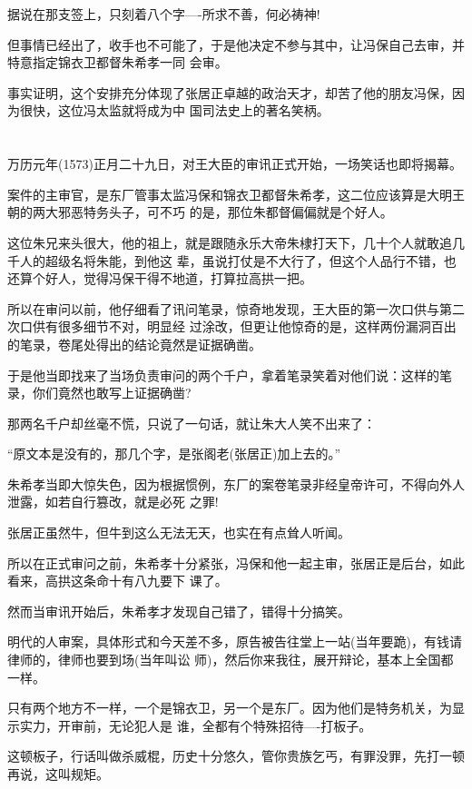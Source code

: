 \documentclass[11pt,a4paper,onecolumn]{article}
\begin{document}
据说在那支签上，只刻着八个字----所求不善，何必祷神!

但事情已经出了，收手也不可能了，于是他决定不参与其中，让冯保自己去审，并特意指定锦衣卫都督朱希孝一同
会审。

事实证明，这个安排充分体现了张居正卓越的政治天才，却苦了他的朋友冯保，因为很快，这位冯太监就将成为中
国司法史上的著名笑柄。

\section[\thesection]{}

万历元年(1573)正月二十九日，对王大臣的审讯正式开始，一场笑话也即将揭幕。

案件的主审官，是东厂管事太监冯保和锦衣卫都督朱希孝，这二位应该算是大明王朝的两大邪恶特务头子，可不巧
的是，那位朱都督偏偏就是个好人。

这位朱兄来头很大，他的祖上，就是跟随永乐大帝朱棣打天下，几十个人就敢追几千人的超级名将朱能，到他这
辈，虽说打仗是不大行了，但这个人品行不错，也还算个好人，觉得冯保干得不地道，打算拉高拱一把。

所以在审问以前，他仔细看了讯问笔录，惊奇地发现，王大臣的第一次口供与第二次口供有很多细节不对，明显经
过涂改，但更让他惊奇的是，这样两份漏洞百出的笔录，卷尾处得出的结论竟然是证据确凿。

于是他当即找来了当场负责审问的两个千户，拿着笔录笑着对他们说：这样的笔录，你们竟然也敢写上证据确凿?

那两名千户却丝毫不慌，只说了一句话，就让朱大人笑不出来了：

``原文本是没有的，那几个字，是张阁老(张居正)加上去的。''

朱希孝当即大惊失色，因为根据惯例，东厂的案卷笔录非经皇帝许可，不得向外人泄露，如若自行篡改，就是必死
之罪!

张居正虽然牛，但牛到这么无法无天，也实在有点耸人听闻。

所以在正式审问之前，朱希孝十分紧张，冯保和他一起主审，张居正是后台，如此看来，高拱这条命十有八九要下
课了。

然而当审讯开始后，朱希孝才发现自己错了，错得十分搞笑。

明代的人审案，具体形式和今天差不多，原告被告往堂上一站(当年要跪)，有钱请律师的，律师也要到场(当年叫讼
师)，然后你来我往，展开辩论，基本上全国都一样。

只有两个地方不一样，一个是锦衣卫，另一个是东厂。因为他们是特务机关，为显示实力，开审前，无论犯人是
谁，全都有个特殊招待----打板子。

这顿板子，行话叫做杀威棍，历史十分悠久，管你贵族乞丐，有罪没罪，先打一顿再说，这叫规矩。
\end{document}
